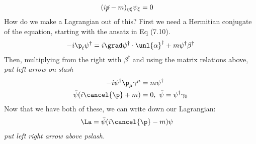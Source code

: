 \documentclass[a4paper, 11pt, normalem]{report}
\begin{document}
\begin{align}
    (i\cancel{p}-m)_{\eta\xi}\psi_{\xi} &= 0
\end{align}
How do we make a Lagrangian out of this?
First we need a Hermitian conjugate of the equation, starting with the ansatz in Eq (7.10).
\begin{align}
    -i\p_t\psi^\dagger &= i\grad\psi^\dagger\cdot\unl{\alpha}^\dagger + m\psi^\dagger\beta^\dagger\\
\end{align}
Then, multiplying from the right with $\beta^\dagger$ and using the matrix relations above, \textit{put left arrow on slash}
\begin{align}
    -i\psi^\dagger\p_\mu\gamma^\mu &= m\psi^\dagger \\
    \bar{\psi}(i\cancel{\p}+m) &= 0,~ \bar{\psi} = \psi^\dagger\gamma_0 
\end{align}
Now that we have both of these, we can write down our Lagrangian:
\begin{align}
    \La &= \bar{\psi}(i\cancel{\p}-m)\psi
\end{align}
\textit{put left right arrow above pslash.}
\end{document}
